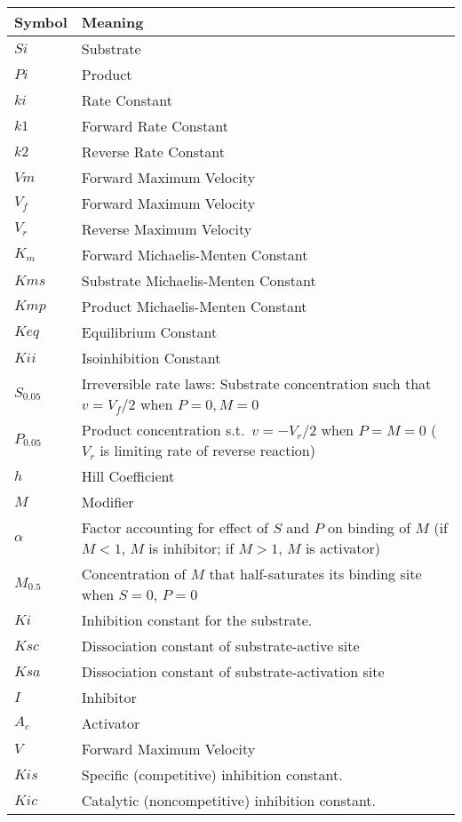 \documentclass[10pt]{cek-article}
\renewcommand{\arraystretch}{1.1}
\begin{document}
\renewcommand{\arraystretch}{1}
\begin{table}[ht]
\begin{tabular}{lp{5.5in}}
\textbf{Symbol} & \textbf{Meaning} \\
\hline
$Si$&  Substrate \\
$Pi$&  Product \\
$ki$&  Rate Constant \\
$k1$&  Forward Rate Constant \\
$k2$&  Reverse Rate Constant \\
$Vm$&  Forward Maximum Velocity \\
$V_f $& Forward Maximum Velocity \\
$V_r $& Reverse Maximum Velocity \\
$K_m $& Forward Michaelis-Menten Constant \\
$Kms$& Substrate Michaelis-Menten Constant \\
$Kmp$& Product Michaelis-Menten Constant \\
$Keq$& Equilibrium Constant \\
$Kii$& Isoinhibition Constant \\
$S_{0.05}$& Irreversible rate laws: Substrate concentration such that $v = V_f/2$ when $P = 0, M=0$ \\
$P_{0.05}$&Product concentration s.t.\ $v = - V_r/2$ when $P = M = 0$ ($V_r$ is limiting rate of reverse reaction) \\
$h$&  Hill Coefficient \\
$M$&   Modifier \\
$\alpha $&  Factor accounting for effect of $S$ and $P$ on binding of $M$ (if $M<1$, $M$ is inhibitor; if $M>1$, $M$ is activator) \\
$M_{0.5}$& Concentration of $M$ that half-saturates its binding site when $S = 0$, $P=0$ \\
$Ki   $&         Inhibition constant for the substrate. \\
$Ksc  $&      Dissociation constant of substrate-active site \\
$Ksa   $&     Dissociation constant of substrate-activation site \\
$I     $&         Inhibitor \\
$A_c    $&      Activator \\
$V     $&        Forward Maximum Velocity \\
$Kis   $&      Specific (competitive) inhibition constant. \\
$Kic   $&      Catalytic (noncompetitive) inhibition constant. \\

\end{tabular}
\end{table}
\end{document}
